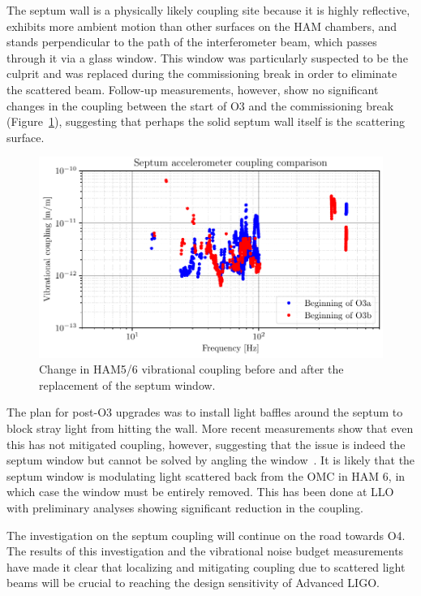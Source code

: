 The septum wall is a physically likely coupling site because it is highly reflective, exhibits more ambient motion than other surfaces on the HAM chambers, and stands perpendicular to the path of the interferometer beam, which passes through it via a glass window.
This window was particularly suspected to be the culprit and was replaced during the commissioning break in order to eliminate the scattered beam.
Follow-up measurements, however, show no significant changes in the coupling between the start of O3 and the commissioning break (Figure~\ref{fig:vib-septum-comparison}), suggesting that perhaps the solid septum wall itself is the scattering surface.

\begin{figure}[htb]
	\includegraphics{figures/noise-studies/vib-septum-comparison.pdf}
	\caption{Change in HAM5/6 vibrational coupling before and after the replacement of the septum window.}
	\label{fig:vib-septum-comparison}
\end{figure}

The plan for post-O3 upgrades was to install light baffles around the septum to block stray light from hitting the wall.
More recent measurements show that even this has not mitigated coupling, however, suggesting that the issue is indeed the septum window but cannot be solved by angling the window~\citep{alog_septum}.
It is likely that the septum window is modulating light scattered back from the \ac{OMC} in HAM 6, in which case the window must be entirely removed.
This has been done at LLO with preliminary analyses showing significant reduction in the coupling.

The investigation on the septum coupling will continue on the road towards O4.
The results of this investigation and the vibrational noise budget measurements have made it clear that localizing and mitigating coupling due to scattered light beams will be crucial to reaching the design sensitivity of Advanced LIGO.



